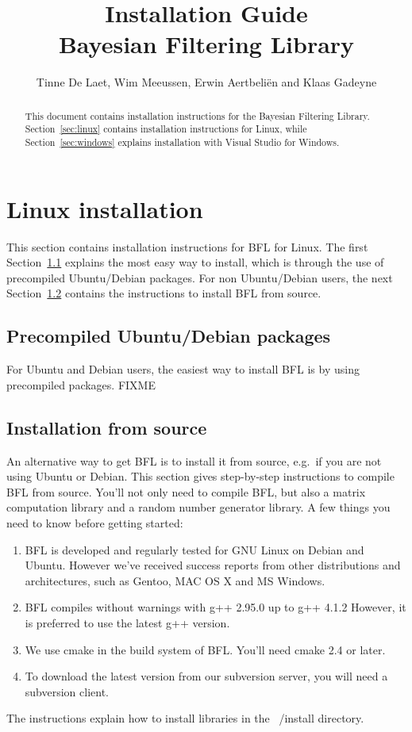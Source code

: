 \documentclass[a4paper,10pt]{article}
\title{Installation Guide \\  Bayesian Filtering Library}
\author{Tinne De Laet, Wim Meeussen, Erwin Aertbeli\"en and Klaas Gadeyne}
\begin{document}
\maketitle

\begin{abstract}
This document contains installation instructions for the Bayesian Filtering Library.
Section~\ref{sec:linux} contains installation instructions for Linux, while Section~\ref{sec:windows} explains installation with Visual Studio for Windows.
\end{abstract}


\section{Linux installation}
\label{sec:linux}
This section contains installation instructions for BFL for Linux.
The first Section~\ref{subsec:ubuntu} explains the most easy way to install, which is through the use of precompiled Ubuntu/Debian packages.
For non Ubuntu/Debian users, the next Section~\ref{subsec:source} contains the instructions to install BFL from source.

\subsection{Precompiled Ubuntu/Debian packages}
\label{subsec:ubuntu}
For Ubuntu and Debian users, the easiest way to install BFL is by
using precompiled packages.  FIXME



\subsection{Installation from source}
\label{subsec:source}
An alternative way to get BFL is to install it from source, e.g.~if
you are not using Ubuntu or Debian. This section gives step-by-step
instructions to compile BFL from source. You'll not only need to
compile BFL, but also a matrix computation library and a random number
generator library. A few things you need to know before getting
started:
\begin{enumerate}
\item BFL is developed and regularly tested for GNU Linux on
  Debian and Ubuntu. However we've received success reports from other
  distributions and architectures, such as Gentoo, MAC OS X and MS
  Windows.
\item BFL compiles without warnings with g++ 2.95.0 up to g++ 4.1.2
  However, it is preferred to use the latest g++ version.
\item We use cmake in the build system of BFL. You'll need cmake 2.4
  or later.
\item To download the latest version from our subversion server, you
  will need a subversion client.
\end{enumerate}
The instructions explain how to install libraries in the ~/install
directory.
\end{document}
